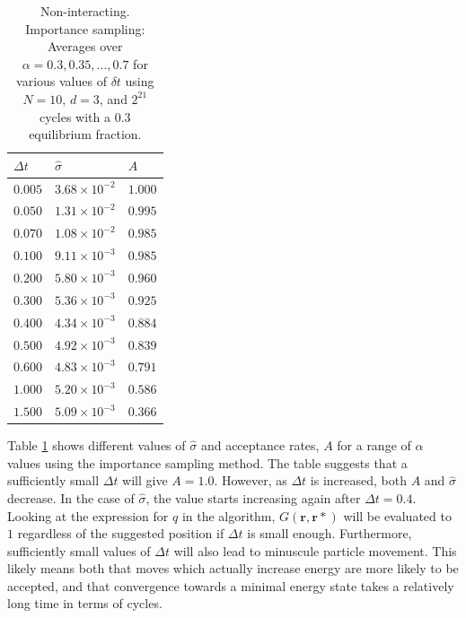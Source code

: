 \documentclass[%
oneside,                 %
final,                   %
10pt]{article}
\begin{document}
\begin{table}[h!]
\begin{center}
\begin{tabular}{lll}
\hline
 $\Delta t$ & $\hat \sigma$ & $A$     \\
\hline
$0.005$ 	      & $3.68 \times 10^{-2}$ & $1.000$  \\  
$0.050$ 	 	  & $1.31 \times 10^{-2}$ & $0.995$  \\  
$0.070$ 	 	  & $1.08 \times 10^{-2}$ & $0.985$  \\  
$0.100$ 	 	  & $9.11 \times 10^{-3}$ & $0.985$  \\  
$0.200$ 	 	  & $5.80 \times 10^{-3}$ & $0.960$  \\  
$0.300$ 	 	  & $5.36 \times 10^{-3}$ & $0.925$  \\  
$0.400$ 	 	  & $4.34 \times 10^{-3}$ & $0.884$  \\  
$0.500$  		  & $4.92 \times 10^{-3}$ & $0.839$  \\  
$0.600$  		  & $4.83 \times 10^{-3}$ & $0.791$  \\  
$1.000$   	 	  & $5.20 \times 10^{-3}$ & $0.586$  \\  
$1.500$  	      & $5.09 \times 10^{-3}$ & $0.366$  \\  
\hline
\end{tabular}
\end{center}
\caption{Non-interacting. Importance sampling: Averages over $\alpha=0.3,0.35,...,0.7$ for various values of $\delta t$ using $N=10$, $d=3$, and $2^{21}$ cycles with a $0.3$ equilibrium fraction.}
\label{table:importance_sampling_deltas}
\end{table}

Table \ref{table:importance_sampling_deltas} shows different values of $\hat \sigma$ and  acceptance rates, $A$ for a range of $\alpha$ values using the importance sampling method. The table suggests that a sufficiently small $\Delta t$ will give $A=1.0$. However, as $\Delta t$ is increased, both $A$ and $\hat \sigma$ decrease. In the case of $\hat \sigma$, the value starts increasing again after $\Delta t=0.4$. Looking at the expression for $q$ in the algorithm, $G(\bm r, \bm r*)$ will be evaluated to $1$ regardless of the suggested position if $\Delta t$ is small enough. Furthermore, sufficiently small values of $\Delta t$ will also lead to minuscule particle movement. This likely means both that moves which actually increase energy are more likely to be accepted, and that convergence towards a minimal energy state takes a relatively long time in terms of cycles.  
\end{document}
